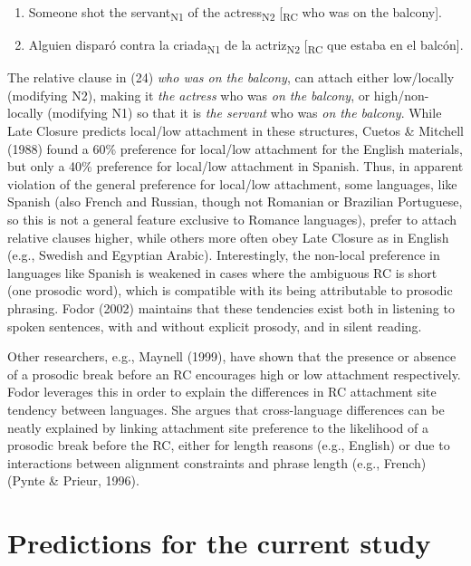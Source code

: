 \documentclass[11pt,oneside]{book}
\providecommand{\tightlist}{%
  \setlength{\itemsep}{0pt}\setlength{\parskip}{0pt}}
\begin{document}
\begin{enumerate}
\def\labelenumi{(\arabic{enumi})}
\setcounter{enumi}{23}
\tightlist
\item
  Someone shot the servant\textsubscript{N1} of the actress\textsubscript{N2} {[}\textsubscript{RC} who was on the balcony{]}.
\item
  Alguien disparó contra la criada\textsubscript{N1} de la actriz\textsubscript{N2} {[}\textsubscript{RC} que estaba en el balcón{]}.
\end{enumerate}

The relative clause in (24) \emph{who was on the balcony}, can attach either low/locally (modifying N2), making it \emph{the actress} who was \emph{on the balcony}, or high/non-locally (modifying N1) so that it is \emph{the servant} who was \emph{on the balcony}. While Late Closure predicts local/low attachment in these structures, Cuetos \& Mitchell (1988) found a 60\% preference for local/low attachment for the English materials, but only a 40\% preference for local/low attachment in Spanish. Thus, in apparent violation of the general preference for local/low attachment, some languages, like Spanish (also French and Russian, though not Romanian or Brazilian Portuguese, so this is not a general feature exclusive to Romance languages), prefer to attach relative clauses higher, while others more often obey Late Closure as in English (e.g., Swedish and Egyptian Arabic). Interestingly, the non-local preference in languages like Spanish is weakened in cases where the ambiguous RC is short (one prosodic word), which is compatible with its being attributable to prosodic phrasing. Fodor (2002) maintains that these tendencies exist both in listening to spoken sentences, with and without explicit prosody, and in silent reading.

Other researchers, e.g., Maynell (1999), have shown that the presence or absence of a prosodic break before an RC encourages high or low attachment respectively. Fodor leverages this in order to explain the differences in RC attachment site tendency between languages. She argues that cross-language differences can be neatly explained by linking attachment site preference to the likelihood of a prosodic break before the RC, either for length reasons (e.g., English) or due to interactions between alignment constraints and phrase length (e.g., French) (Pynte \& Prieur, 1996).

\hypertarget{pred}{%
\section{Predictions for the current study}\label{pred}}
\end{document}
